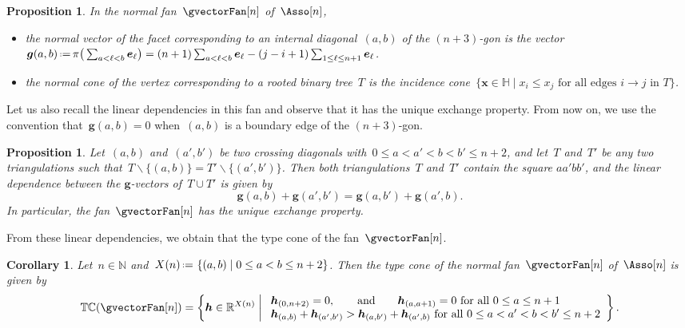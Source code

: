 \documentclass{amsart}
\newtheorem{corollary}[theorem]{Corollary}
\newtheorem{proposition}[theorem]{Proposition}
\theoremstyle{definition}
\newcommand{\R}{\mathbb{R}} %
\newcommand{\N}{\mathbb{N}} %
\newcommand{\HH}{\mathbb{H}} %
\renewcommand{\b}[1]{{\boldsymbol{#1}}} %
\newcommand{\set}[2]{\left\{ #1 \;\middle|\; #2 \right\}} %
\newcommand{\bigset}[2]{\big\{ #1 \;\big|\; #2 \big\}} %
\newcommand{\ssm}{\smallsetminus} %
\newcommand{\eqdef}{\mbox{\,\raisebox{0.2ex}{\scriptsize\ensuremath{\mathrm:}}\ensuremath{=}\,}} %
\newcommand{\gvector}[1]{\b{g}(#1)} %
\newcommand{\typeCone}{\mathbb{TC}} %
\begin{document}
\begin{proposition}
In the normal fan~$\gvectorFan[n]$ of~$\Asso[n]$, 
\begin{itemize}
\item the normal vector of the facet corresponding to an internal diagonal~$(a,b)$ of the $(n+3)$-gon is the vector~$\gvector{a,b} \eqdef \pi\big( \sum_{a < \ell < b} \b{e}_\ell \big) = (n+1) \sum_{a < \ell < b} \b{e}_\ell - (j-i+1) \sum_{1 \le \ell \le n+1} \b{e}_\ell$.
\item the normal cone of the vertex corresponding to a rooted binary tree~$T$ is the incidence cone~$\bigset{\b{x} \in \HH}{x_i \le x_j \text{ for all edges $i \to j$ in $T$}}$.
\end{itemize}
\end{proposition}

Let us also recall the linear dependencies in this fan and observe that it has the unique exchange property.
From now on, we use the convention that~$\gvector{a,b} = 0$ when~$(a,b)$ is a boundary edge of the $(n+3)$-gon.

\begin{proposition}
\label{prop:exchangeablePairsAsso}
Let~$(a,b)$ and~$(a',b')$ be two crossing diagonals with~${0 \le a < a' < b < b' \le n+2}$, and let~$T$ and~$T'$ be any two triangulations such that~$T \ssm \{(a,b)\} = T' \ssm \{(a',b')\}$.
Then both triangulations~$T$ and~$T'$ contain the square $aa'bb'$, and the linear dependence between the $\b{g}$-vectors of~$T \cup T'$ is given by
\[
\gvector{a,b} + \gvector{a',b'} = \gvector{a,b'} + \gvector{a',b}.
\]
In particular, the fan~$\gvectorFan[n]$ has the unique exchange property.
\end{proposition}

From these linear dependencies, we obtain that the type cone of the fan~$\gvectorFan[n]$.

\begin{corollary}
Let~$n \in \N$ and~$X(n) \eqdef \set{(a,b)}{0 \le a < b \le n+2}$. Then the type cone of the normal fan~$\gvectorFan[n]$ of~$\Asso[n]$ is given by
\[
\typeCone(\gvectorFan[n]) = \set{\b{h} \in \R^{X(n)}}{\begin{array}{l} \b{h}_{(0,n+2)} = 0, \qquad\text{and}\qquad \b{h}_{(a,a+1)} = 0 \text{ for all } 0 \le a \le n+1 \\ \b{h}_{(a,b)} + \b{h}_{(a',b')} > \b{h}_{(a,b')} + \b{h}_{(a',b)} \text{ for all } 0 \le a < a' < b < b' \le n+2 \end{array}}.
\]
\end{corollary}
\end{document}

